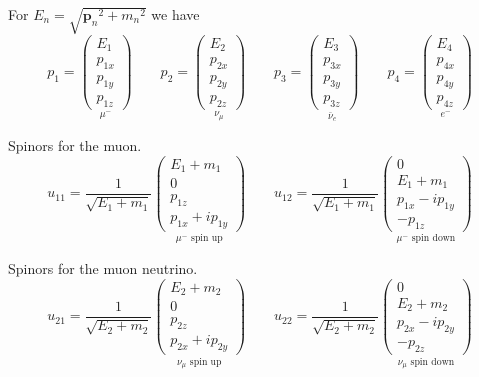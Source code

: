 For $E_n=\sqrt{{\mathbf p_n}^2+{m_n}^2}$ we have
\begin{equation*}
p_1=\underset{\mu^-}
{\begin{pmatrix}E_1\\p_{1x}\\p_{1y}\\p_{1z}\end{pmatrix}}
\qquad
p_2=\underset{\nu_\mu}
{\begin{pmatrix}E_2\\p_{2x}\\p_{2y}\\p_{2z}\end{pmatrix}}
\qquad
p_3=\underset{\bar\nu_e}
{\begin{pmatrix}E_3\\p_{3x}\\p_{3y}\\p_{3z}\end{pmatrix}}
\qquad
p_4=\underset{e^-}
{\begin{pmatrix}E_4\\p_{4x}\\p_{4y}\\p_{4z}\end{pmatrix}}
\end{equation*}

Spinors for the muon.
\begin{equation*}
u_{11}=\frac{1}{\sqrt{E_1+m_1}}
\underset{\text{$\mu^-$ spin up}}
{\begin{pmatrix}E_1+m_1\\0\\p_{1z}\\p_{1x}+ip_{1y}\end{pmatrix}}
\qquad
u_{12}=\frac{1}{\sqrt{E_1+m_1}}
\underset{\text{$\mu^-$ spin down}}
{\begin{pmatrix}0\\E_1+m_1\\p_{1x}-ip_{1y}\\-p_{1z}\end{pmatrix}}
\end{equation*}

Spinors for the muon neutrino.
\begin{equation*}
u_{21}=\frac{1}{\sqrt{E_2+m_2}}
\underset{\text{$\nu_\mu$ spin up}}
{\begin{pmatrix}E_2+m_2\\0\\p_{2z}\\p_{2x}+ip_{2y}\end{pmatrix}}
\qquad
u_{22}=\frac{1}{\sqrt{E_2+m_2}}
\underset{\text{$\nu_\mu$ spin down}}
{\begin{pmatrix}0\\E_2+m_2\\p_{2x}-ip_{2y}\\-p_{2z}\end{pmatrix}}
\end{equation*}

